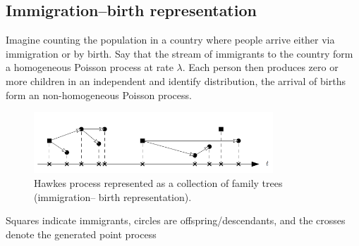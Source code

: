 \subsection{Immigration–birth representation}
 Imagine counting the population in a country where people
 arrive either via immigration or by birth. Say that the stream of immigrants to the country form a homogeneous Poisson process at rate $\lambda$. Each person then produces zero or more children in an independent and identify distribution, the arrival of births form an non-homogeneous Poisson process.
  \begin{figure}[H]
  	\centering
  	\includegraphics[width=0.8\textwidth]{Immigrate_Birth.PNG}
  	\caption{Hawkes process represented as a collection of family trees (immigration–
  		birth representation).}
 
  	\label{Immigrate_Birth}
  \end{figure}
  Squares indicate immigrants, circles are offspring/descendants, and the crosses denote the generated point process
